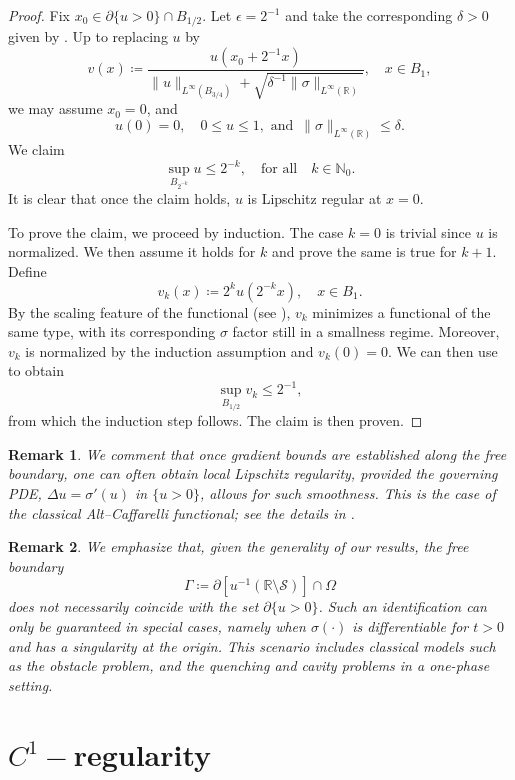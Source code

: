\documentclass[reqno,11pt]{amsart}
\newtheorem{remark}{Remark}[section]
\newcommand{\1}{\mathds{1}}  %
\numberwithin{equation}{section}
\begin{document}
\begin{proof}
Fix $x_0 \in \partial \{u>0\} \cap B_{1/2}$. Let $\epsilon = 2^{-1}$ and take the corresponding $\delta >0$ given by . Up to replacing $u$ by
$$
    v(x) \coloneqq \frac{u(x_0+2^{-1}x)}{\|u\|_{L^\infty(B_{3/4})} + \sqrt{\delta^{-1}\|\sigma\|_{L^\infty(\mathbb{R})}}}, \quad x \in B_1,
$$
we may assume $x_0 = 0$, and
$$
   u(0) = 0, \quad 0 \leq u \leq 1, \text{ and }\, \|\sigma\|_{L^\infty(\mathbb{R})} \leq \delta.
$$
We claim
$$
    \sup_{B_{2^{-k}}} u \leq 2^{-k}, \quad \text{for all} \quad k \in \mathbb{N}_0. 
$$
It is clear that once the claim holds, $u$ is Lipschitz regular at $x=0$.

To prove the claim, we proceed by induction. The case $k = 0$ is trivial since $u$ is normalized. We then assume it holds for $k$ and prove the same is true for $k+1$. Define
$$
    v_k(x) \coloneqq 2^ku(2^{-k}x), \quad x \in B_1.
$$
By the scaling feature of the functional (see ), $v_k$ minimizes a functional of the same type, with its corresponding $\sigma$ factor still in a smallness regime. Moreover, $v_k$ is normalized by the induction assumption and $v_k(0) = 0$. We can then use  to obtain
$$
    \sup_{B_{1/2}}v_k \leq 2^{-1},
$$
from which the induction step follows. The claim is then proven.
\end{proof}

\begin{remark}
We comment that once gradient bounds are established along the free boundary, one can often obtain local Lipschitz regularity, provided the governing PDE, $\Delta u = \sigma'(u)$ in $\{u > 0\}$, allows for such smoothness. This is the case of the classical Alt--Caffarelli functional; see the details in \cite{PT16}.
\end{remark}

\begin{remark}
We emphasize that, given the generality of our results, the free boundary 
$$
    \Gamma \coloneqq \partial \left [u^{-1}(\mathbb{R} \setminus \mathscr{S}) \right ] \cap \Omega
$$
does not necessarily coincide with the set $\partial\{u>0\}$. Such an identification can only be guaranteed in special cases, namely when $\sigma (\cdot)$ is differentiable for $t>0$ and has a singularity at the origin. This scenario includes classical models such as the obstacle problem, and the quenching and cavity problems in a one-phase setting.
\end{remark}

\section{$C^1-$regularity}\label{C1 - sct}
\end{document}
